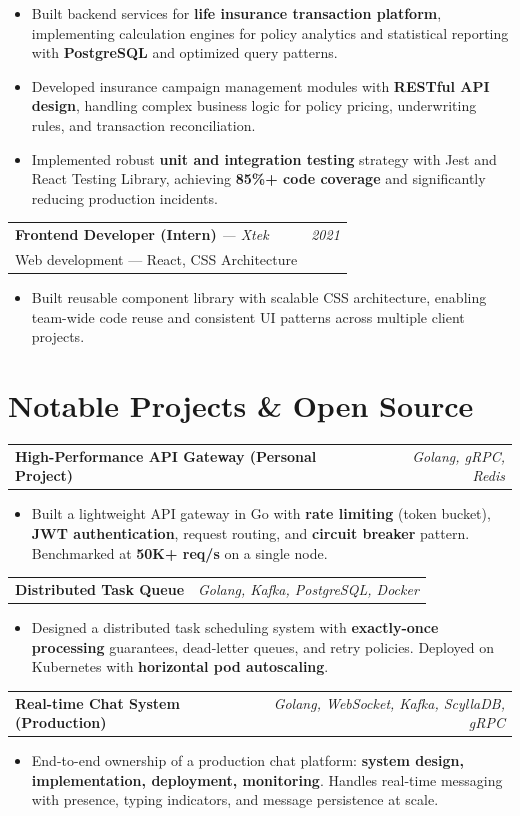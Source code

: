 \documentclass[a4paper,11pt]{article}
\newcommand{\resumeSubheading}[4]{
  \vspace{-1pt}
  \begin{tabularx}{\textwidth}{X r}
    \textbf{#1} \textit{\small --- #2} & \textit{\small #3} \\
    \small #4 & \\
  \end{tabularx}\vspace{-6pt}
}
\newcommand{\resumeProjectHeading}[2]{
  \vspace{-1pt}
  \begin{tabularx}{\textwidth}{X r}
    \textbf{#1} & \textit{\small #2} \\
  \end{tabularx}\vspace{-6pt}
}
\newcommand{\resumeItemListStart}{\begin{itemize}[leftmargin=0.2in, label=\textbullet, itemsep=1pt, parsep=0pt]}
\newcommand{\resumeItemListEnd}{\end{itemize}\vspace{-4pt}}
\newcommand{\resumeItem}[1]{\item\small{#1}}
\begin{document}
\resumeItemListStart
  \resumeItem{Built backend services for \textbf{life insurance transaction platform}, implementing calculation engines for policy analytics and statistical reporting with \textbf{PostgreSQL} and optimized query patterns.}
  \resumeItem{Developed insurance campaign management modules with \textbf{RESTful API design}, handling complex business logic for policy pricing, underwriting rules, and transaction reconciliation.}
  \resumeItem{Implemented robust \textbf{unit and integration testing} strategy with Jest and React Testing Library, achieving \textbf{85\%+ code coverage} and significantly reducing production incidents.}
\resumeItemListEnd

\resumeSubheading
  {Frontend Developer (Intern)}{Xtek}{2021}
  {Web development --- React, CSS Architecture}

\resumeItemListStart
  \resumeItem{Built reusable component library with scalable CSS architecture, enabling team-wide code reuse and consistent UI patterns across multiple client projects.}
\resumeItemListEnd

\section{Notable Projects \& Open Source}

\resumeProjectHeading{High-Performance API Gateway (Personal Project)}{Golang, gRPC, Redis}
\resumeItemListStart
  \resumeItem{Built a lightweight API gateway in Go with \textbf{rate limiting} (token bucket), \textbf{JWT authentication}, request routing, and \textbf{circuit breaker} pattern. Benchmarked at \textbf{50K+ req/s} on a single node.}
\resumeItemListEnd

\resumeProjectHeading{Distributed Task Queue}{Golang, Kafka, PostgreSQL, Docker}
\resumeItemListStart
  \resumeItem{Designed a distributed task scheduling system with \textbf{exactly-once processing} guarantees, dead-letter queues, and retry policies. Deployed on Kubernetes with \textbf{horizontal pod autoscaling}.}
\resumeItemListEnd

\resumeProjectHeading{Real-time Chat System (Production)}{Golang, WebSocket, Kafka, ScyllaDB, gRPC}
\resumeItemListStart
  \resumeItem{End-to-end ownership of a production chat platform: \textbf{system design, implementation, deployment, monitoring}. Handles real-time messaging with presence, typing indicators, and message persistence at scale.}
\resumeItemListEnd

\end{document}

